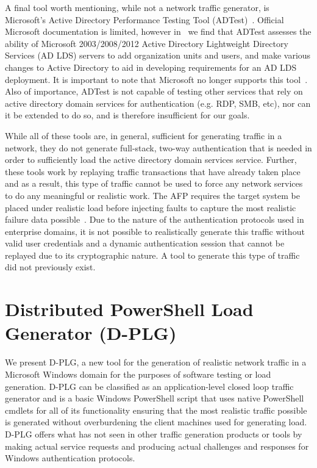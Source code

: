 A final tool worth mentioning, while not a network traffic generator, is
Microsoft's Active Directory Performance Testing Tool
(ADTest)~\cite{microsoft12}.  Official Microsoft documentation is limited,
however in~\cite{bijaoui2011,morowczynski2014,suyanto2010,suyanto2010_2} we
find that ADTest assesses the ability of Microsoft 2003/2008/2012 Active
Directory Lightweight Directory Services (AD LDS) servers to add organization
units and users, and make various changes to Active Directory to aid in
developing requirements for an AD LDS deployment.  It is important to note that
Microsoft no longer supports this tool~\cite{morowczynski2014}.  Also of
importance, ADTest is not capable of testing other services that rely on active
directory domain services for authentication (e.g. RDP, SMB, etc), nor can it
be extended to do so, and is therefore insufficient for our goals.

While all of these tools are, in general, sufficient for generating traffic in
a network, they do not generate full-stack, two-way authentication that is
needed in order to sufficiently load the active directory domain services
service.  Further, these tools work by replaying traffic transactions that have
already taken place and as a result, this type of traffic cannot be used to
force any network services to do any meaningful or realistic work.  The AFP
requires the target system be placed under realistic load before injecting
faults to capture the most realistic failure data
possible~\cite{irrera2014,irrera2015}.  Due to the nature of the authentication
protocols used in enterprise domains, it is not possible to realistically
generate this traffic without valid user credentials and a dynamic
authentication session that cannot be replayed due to its cryptographic nature.
A tool to generate this type of traffic did not previously exist.

\section{Distributed PowerShell Load Generator (D-PLG)} \label{sec:contrib} 
We present D-PLG, a new tool for the generation of realistic network traffic in
a Microsoft Windows domain for the purposes of software testing or load
generation.  D-PLG can be classified as an application-level closed loop
traffic generator and is a basic Windows PowerShell script that uses native
PowerShell cmdlets for all of its functionality ensuring that the most
realistic traffic possible is generated without overburdening the client
machines used for generating load.  D-PLG offers what has not seen in other
traffic generation products or tools by making actual service requests and
producing actual challenges and responses for Windows authentication protocols.

